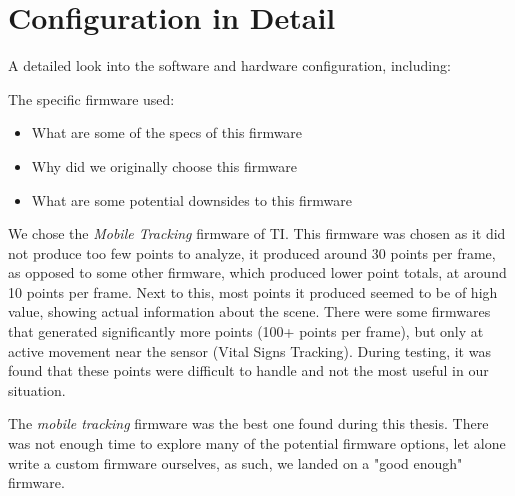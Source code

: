 \chapter{Configuration in Detail}
\label{appendix: configuration in detail}

A detailed look into the software and hardware configuration, including:

The specific firmware used:
\begin{itemize}
    \item What are some of the specs of this firmware
    \item Why did we originally choose this firmware
    \item What are some potential downsides to this firmware
\end{itemize}




We chose the \textit{Mobile Tracking} firmware of TI.
This firmware was chosen as it did not produce too few points to analyze, it produced around 30 points per frame, as opposed to some other firmware, which produced lower point totals, at around 10 points per frame. 
Next to this, most points it produced seemed to be of high value, showing actual information about the scene.
There were some firmwares that generated significantly more points (100+ points per frame), but only at active movement near the sensor (Vital Signs Tracking). 
During testing, it was found that these points were difficult to handle and not the most useful in our situation.

The \textit{mobile tracking} firmware was the best one found during this thesis.
There was not enough time to explore many of the potential firmware options, let alone write a custom firmware ourselves, as such, we landed on a "good enough" firmware.


